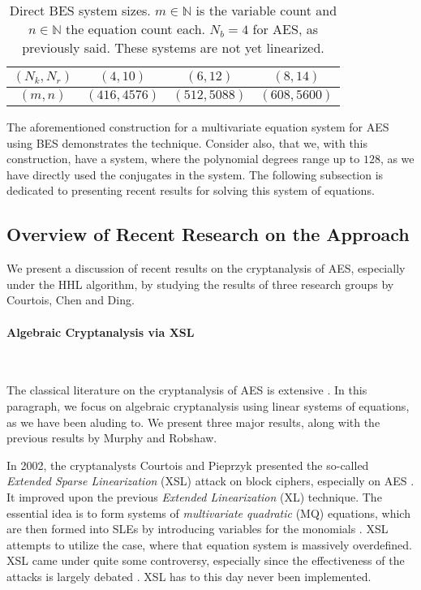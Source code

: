 \begin{table}[!hbtp]
    \centering
    \begin{tabular}{|c|c|c|c|}
        \hline
        \((N_k, N_r)\) & \((4, 10)\) & \((6, 12)\) & \((8, 14)\)\\ \hline
        \((m, n)\) & \((416, 4576)\) & \((512, 5088)\) & \((608, 5600)\)\\ \hline
    \end{tabular}
    \caption{Direct BES system sizes. \(m \in \mathbb{N}\) is the variable count and \(n \in \mathbb{N}\) the equation count each. \(N_b = 4\) for AES, as previously said. These systems are not yet linearized.}
    \label{direct_bes_system_sizes}
\end{table}

The aforementioned construction for a multivariate equation system for AES using BES demonstrates the technique. Consider also, that we, with this construction, have a system, where the polynomial degrees range up to \(128\), as we have directly used the conjugates in the system. The following subsection is dedicated to presenting recent results for solving this system of equations.

\subsection{Overview of Recent Research on the Approach }

We present a discussion of recent results on the cryptanalysis of AES, especially under the HHL algorithm, by studying the results of three research groups by Courtois, Chen and Ding.

\paragraph*{Algebraic Cryptanalysis via XSL} \phantom{}\\\phantom{}

The classical literature on the cryptanalysis of AES is extensive \cite{Nover, Kaminsky2010, Daemen_2020, Gao2022}. In this paragraph, we focus on algebraic cryptanalysis using linear systems of equations, as we have been aluding to. We present three major results, along with the previous results by Murphy and Robshaw.

In 2002, the cryptanalysts Courtois and Pieprzyk presented the so-called \emph{Extended Sparse Linearization} (XSL) attack on block ciphers, especially on AES \cite{Courtois2002}. It improved upon the previous \emph{Extended Linearization} (XL) technique. The essential idea is to form systems of \emph{multivariate quadratic} (MQ) equations, which are then formed into SLEs by introducing variables for the monomials \cite[p. 2]{Kaminsky2010}. XSL attempts to utilize the case, where that equation system is massively overdefined. XSL came under quite some controversy, especially since the effectiveness of the attacks is largely debated \cite[p. 2]{Kaminsky2010} \cite[pp. 15-16]{Nover}. XSL has to this day never been implemented.

